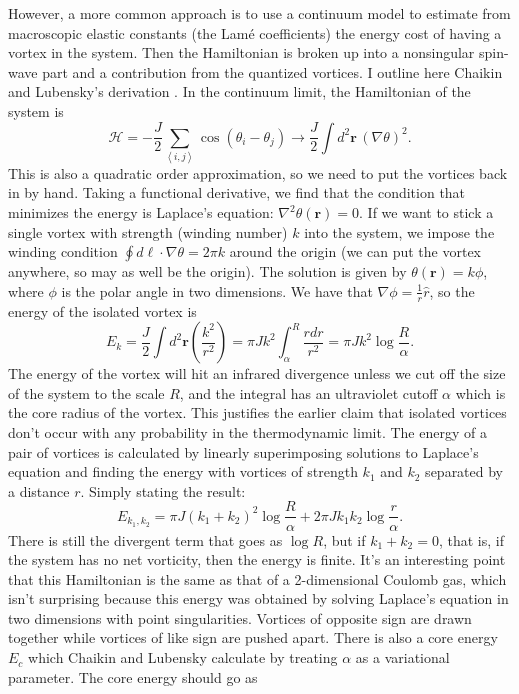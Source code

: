 \documentclass[a4paper,10pt]{article}
\newcommand{\beq}{\begin{equation}}
\newcommand{\eeq}{\end{equation}}
\renewcommand{\a}{\alpha}
\renewcommand{\th}{\theta}
\newcommand{\paren}[1]{\left(#1\right)}
\newcommand{\recip}[1]{\frac{1}{#1}}
\newcommand{\goto}{\rightarrow}
\newcommand{\half}[1]{\frac{#1}{2}}
\newcommand{\bv}[1]{\mathbf{#1}}
\newcommand{\br}{\ensuremath{\bv{r}}}
\begin{document}
However, a more common approach is to use a continuum model to estimate from 
macroscopic elastic constants (the Lam\'e coefficients) the energy cost of 
having a vortex in the system. Then the Hamiltonian is broken up into a 
nonsingular spin-wave part and a contribution from the quantized vortices. 
I outline here Chaikin and Lubensky's derivation \cite{Chaikin}. In the 
continuum limit, the Hamiltonian of the system is
\beq \mathcal{H} = -\half{J}\sum_{\left \langle i,j \right \rangle} 
\cos\paren{\th_i - \th_j} \goto \half{J} \int d^2\bv r \, 
\paren{\nabla \th}^2.\eeq
This is also a quadratic order approximation, so we need to put the 
vortices back in by hand. Taking a functional derivative, we find that the 
condition that minimizes the energy is Laplace's equation: $\nabla^2\th(\bv r) = 
0$. If we want to stick a single vortex with strength (winding number) $k$ into 
the system, we impose the winding condition $\oint d\bv \ell \cdot \nabla \th = 
2\pi k$ around the origin (we can put the vortex anywhere, so may as well be 
the origin). The solution is given by $\th(\br) = k\phi$, where $\phi$ is the 
polar angle in two dimensions. We have that $\nabla\phi = \recip{r} \hat{r}$, so 
the energy of the isolated vortex is
\beq E_k = \frac{J}{2} \int d^2\br \paren{\frac{k^2}{r^2}} = \pi 
Jk^2 \int_\a^R \frac{r dr}{r^2} = \pi J 
k^2\log\frac{R}{\a}.\eeq
The energy of the vortex will hit an infrared divergence unless we cut off 
the size of the system to the scale $R$, and the integral has an ultraviolet 
cutoff $\a$ which is the core radius of the vortex. This justifies the earlier 
claim that isolated vortices don't occur with any probability in the 
thermodynamic limit. The energy of a pair of vortices is calculated by linearly 
superimposing solutions to Laplace's equation and finding the energy with 
vortices of strength $k_1$ and $k_2$ separated by a distance $r$. Simply stating 
the result:
\beq E_{k_1,k_2} = \pi J \paren{k_1+k_2}^2 \log\frac{R}{\a} + 
2\pi Jk_1k_2 \log \frac{r}{\a}. \eeq
There is still the divergent term that goes as $\log R$, but if $k_1+k_2 = 0$, 
that is, if the system has no net vorticity, then the energy is 
finite. It's an interesting point that this Hamiltonian is the same as that of 
a 2-dimensional Coulomb gas, which isn't surprising because this energy was 
obtained by solving Laplace's equation in two dimensions with point 
singularities. Vortices of opposite sign are drawn together while vortices of 
like sign are pushed apart.
There is also a core energy $E_c$ which Chaikin and Lubensky calculate by 
treating $\a$ as a variational parameter. The core energy should go as 
\end{document}

